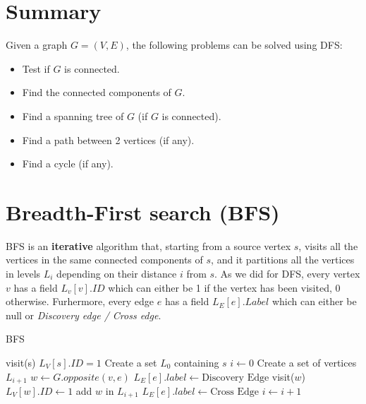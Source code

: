 \section{Summary}
Given a graph $G = (V, E)$, the following problems can be solved using DFS:
\begin{itemize}
    \item Test if $G$ is connected.
    \item Find the connected components of $G$.
    \item Find a spanning tree of $G$ (if $G$ is connected).
    \item Find a path between 2 vertices (if any).
    \item Find a cycle (if any).
\end{itemize}

\section{Breadth-First search (BFS)}
BFS is an \textbf{iterative} algorithm that, starting from a source vertex $s$, visits all the vertices in the same connected components of $s$, and it partitions all the vertices in levels $L_{i}$ depending on their distance $i$ from $s$. \newline\newline
As we did for DFS, every vertex $v$ has a field $L_{v}[v].ID$ which can either be 1 if the vertex has been visited, 0 otherwise. Furhermore, every edge $e$ has a field $L_{E}[e].Label$ which can either be null or \textit{Discovery edge / Cross edge}.
\begin{algorithm}
\caption{BFS}\label{BFS}
    \begin{algorithmic}[1]
     \State visit(s)
     \State $L_{V}[s].ID = 1$
     \State Create a set $L_{0}$ containing $s$
     \State $i \gets 0$
        \State Create a set of vertices $L_{i+1}$
                    \State $w \gets G.opposite(v, e)$
                        \State $L_{E}[e].label \gets \text{Discovery Edge}$
                        \State visit($w$)
                        \State $L_{V}[w].ID \gets 1$
                        \State add $w$ in $L_{i + 1}$
                    \Else
                        \State $L_{E}[e].label \gets \text{Cross Edge}$
                    \EndIf
                \EndIf
            \EndFor
        \EndFor
        \State $i \gets i + 1$
     \EndWhile
    \EndProcedure
    \end{algorithmic}
\end{algorithm}\newline\newline
